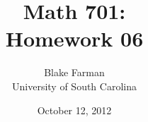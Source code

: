 \documentclass[10pt]{amsart}
\author{Blake Farman\\University of South Carolina}
\title{Math 701:\\Homework 06}
\date{October 12, 2012}
\begin{document}
\maketitle

\newcommand{\Inn}[1]{\operatorname{Inn}\left(#1\right)}
\newcommand{\Aut}[1]{\operatorname{Aut}\left(#1\right)}
\newcommand{\cntr}[1]{\mathbf{Z}\left(#1\right)}
\newcommand{\abs}[1]{\left| #1 \right|}
\newcommand{\SL}[2]{\operatorname{SL}_#1\left(#2\right)}
\newcommand{\Mat}[2]{\operatorname{Mat}_{#1}\left(#2\right)}
\newcommand{\orbit}[1]{\mathcal{O}_{#1}}
\newcommand{\real}[1]{\operatorname{\mathfrak{Re}}\left(#1\right)}
\newcommand{\imag}[1]{\operatorname{\mathfrak{Im}}\left(#1\right)}
\newcommand{\uhp}{\mathfrak{h}}
\newcommand{\Syl}[2]{\operatorname{Syl}_{#1}\left(#2\right)}

\renewcommand{\qedsymbol}{\ensuremath{\blacksquare}}

\newtheorem{thm}{}
\newtheorem{lem}{Lemma}
\end{document}
